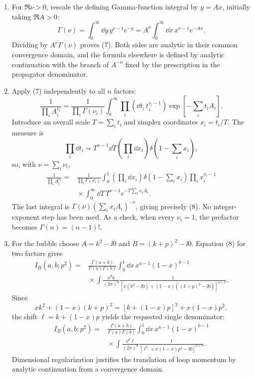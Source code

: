 \begin{enumerate}
\begin{enumerate}
\item
For \(\Re\nu>0\), rescale the defining Gamma-function integral by
\(y=Ax\), initially taking \(\Re A>0\):
\[
 \Gamma(\nu)=\int_0^\infty \dd y\,y^{\nu-1}e^{-y}
 =A^\nu\int_0^\infty \dd x\,x^{\nu-1}e^{-Ax}.
\]
Dividing by \(A^\nu\Gamma(\nu)\) proves (7).  Both sides are analytic in
their common convergence domain, and the formula elsewhere is defined by
analytic continuation with the branch of \(A^{-\nu}\) fixed by the
prescription in the propagator denominator.

\item
Apply (7) independently to all \(n\) factors:
\[
 \frac{1}{\prod_iA_i^{\nu_i}}
 =\frac{1}{\prod_i\Gamma(\nu_i)}
 \int_0^\infty\prod_i(\dd t_i\,t_i^{\nu_i-1})
 \exp\!\left[-\sum_i t_iA_i\right].
\]
Introduce an overall scale \(T=\sum_i t_i\) and simplex coordinates
\(x_i=t_i/T\).  The measure is
\[
 \prod_i \dd t_i
 =T^{n-1}\dd T\left(\prod_i \dd x_i\right)
 \delta\!\left(1-\sum_i x_i\right),
\]
so, with \(\nu=\sum_i\nu_i\),
\[
\begin{aligned}
 \frac{1}{\prod_iA_i^{\nu_i}}
 ={}&\frac{1}{\prod_i\Gamma(\nu_i)}
 \int_0^1\!\left(\prod_i \dd x_i\right)
 \delta\!\left(1-\sum_i x_i\right)
 \prod_i x_i^{\nu_i-1}\\
 &{}\times\int_0^\infty \dd T\,T^{\nu-1}
 e^{-T\sum_i x_iA_i}.
\end{aligned}
\]
The last integral is
\(\Gamma(\nu)(\sum_i x_iA_i)^{-\nu}\), giving precisely (8).  No
integer-exponent step has been used.  As a check, when every
\(\nu_i=1\), the prefactor becomes \(\Gamma(n)=(n-1)!\).

\item
For the bubble choose
\(A=k^2-\ii0\) and \(B=(k+p)^2-\ii0\).  Equation (8) for two factors gives
\[
\begin{aligned}
 I_B(a,b;p^2)
 ={}&\frac{\Gamma(a+b)}{\Gamma(a)\Gamma(b)}
 \int_0^1\dd x\,x^{a-1}(1-x)^{b-1}\\
 &{}\times\int\frac{\dd^dk}{(2\pi)^d}
 \frac{1}{[x(k^2-\ii0)+(1-x)((k+p)^2-\ii0)]^{a+b}}.
\end{aligned}
\]
Since
\[
 xk^2+(1-x)(k+p)^2
 =[k+(1-x)p]^2+x(1-x)p^2,
\]
the shift \(\ell=k+(1-x)p\) yields the requested single denominator:
\[
 \boxed{\begin{aligned}
 I_B(a,b;p^2)
 ={}&\frac{\Gamma(a+b)}{\Gamma(a)\Gamma(b)}
 \int_0^1\dd x\,x^{a-1}(1-x)^{b-1}\\
 &{}\times\int\frac{\dd^d\ell}{(2\pi)^d}
 \frac{1}{[\ell^2+x(1-x)p^2-\ii0]^{a+b}}.
 \end{aligned}}
\]
Dimensional regularization justifies the translation of loop momentum by
analytic continuation from a convergence domain.


\end{enumerate}
\end{enumerate}
